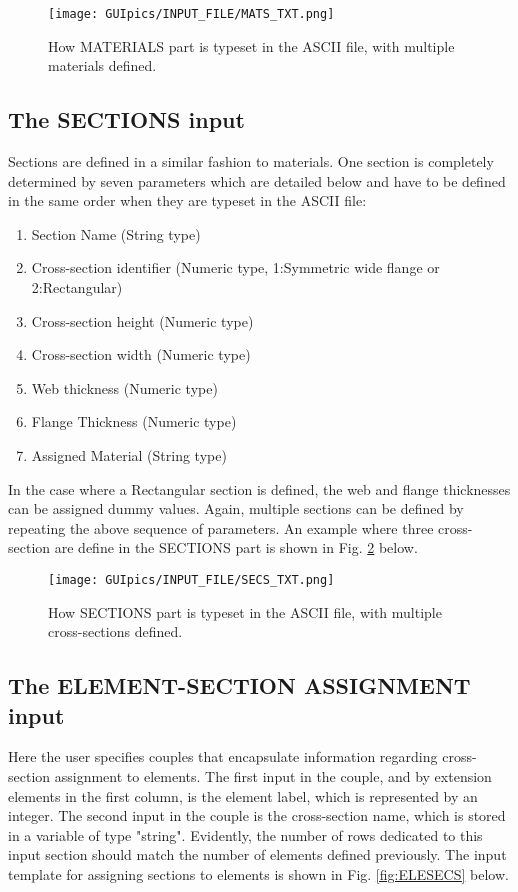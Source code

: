 \begin{appendices}
\begin{figure}[t]
	\centering
	\texttt{[image: GUIpics/INPUT\_FILE/MATS\_TXT.png]}
	\caption{How MATERIALS part is typeset in the ASCII file, with multiple 
		materials defined.}
	\label{fig:MATS}
\end{figure}

\subsection*{The SECTIONS input}

Sections are defined in a similar fashion to materials. One section is 
completely determined by seven parameters which are detailed below and have to 
be defined in the same order when they are typeset in the ASCII file:

\begin{enumerate}
	\item Section Name (String type)
	\item Cross-section identifier (Numeric type, 1:Symmetric wide flange or 
	2:Rectangular)
	\item Cross-section height (Numeric type)
	\item Cross-section width (Numeric type)
	\item Web thickness (Numeric type)
	\item Flange Thickness (Numeric type)
	\item Assigned Material (String type)
\end{enumerate}

In the case where a Rectangular section is defined, the web and flange 
thicknesses can be assigned dummy values. Again, multiple sections can be 
defined by repeating the above sequence of parameters. An example where three 
cross-section are define in the SECTIONS part is shown in Fig. \ref{fig:SECS} 
below.

\begin{figure}[t]
	\centering
	\texttt{[image: GUIpics/INPUT\_FILE/SECS\_TXT.png]}
	\caption{How SECTIONS part is typeset in the ASCII file, with multiple 
		cross-sections defined.}
	\label{fig:SECS}
\end{figure}


\subsection*{The ELEMENT-SECTION ASSIGNMENT input}

Here the user specifies couples that encapsulate information regarding 
cross-section assignment to elements. The first input in the couple, and by 
extension elements in the first column, is the element label, which is 
represented by an integer. The second input in the couple is the cross-section 
name, which is stored in a variable of type "string". Evidently, the number of 
rows dedicated to this input section should match the number of elements 
defined previously. The input template for assigning sections to elements is 
shown in Fig. \ref{fig:ELESECS} below.


\end{appendices}
